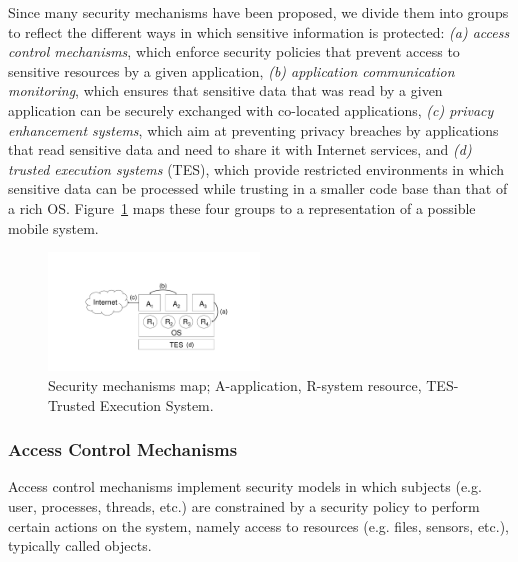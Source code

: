Since many security mechanisms have been proposed, we divide them into groups to reflect the different ways in which sensitive information is protected: \emph{(a) access control mechanisms}, which enforce security policies that prevent access to sensitive resources by a given application, \emph{(b) application communication monitoring}, which ensures that sensitive data that was read by a given application can be securely exchanged with co-located applications, \emph{(c) privacy enhancement systems}, which aim at preventing privacy breaches by applications that read sensitive data and need to share it with Internet services, and \emph{(d) trusted execution systems} (TES), which provide restricted environments in which sensitive data can be processed while trusting in a smaller code base than that of a rich OS. Figure~\ref{fig:relwork} maps these four groups to a representation of a possible mobile system.

\begin{figure}[t!]
	\centering
	\includegraphics[width=0.50\textwidth]{img/relwork.pdf}
	\caption{Security mechanisms map; A-application, R-system resource, TES-Trusted Execution System.}
	\label{fig:relwork}
\end{figure}

\subsubsection{Access Control Mechanisms}
\label{sec:accesscontrol}

Access control mechanisms implement security models in which subjects (e.g. user, processes, threads, etc.) are constrained by a security policy to perform certain actions on the system, namely access to resources (e.g. files, sensors, etc.), typically called objects.

